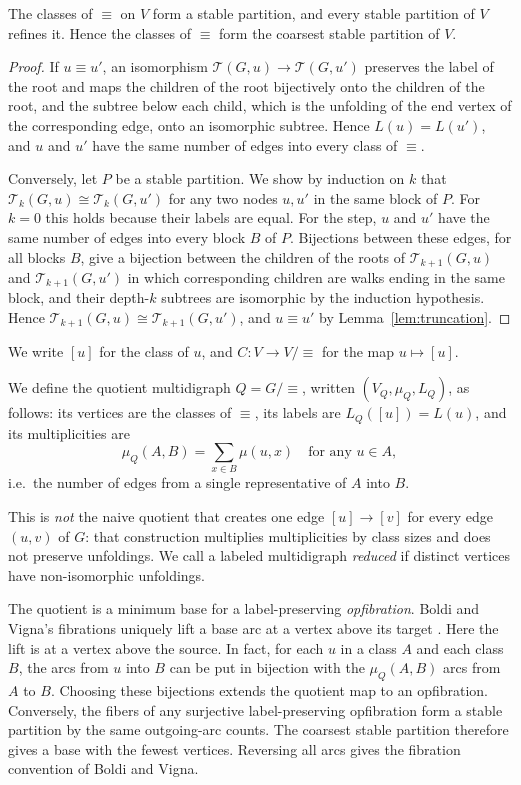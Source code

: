 \documentclass[twoside,leqno]{article}
\newcommand{\Unf}{\mathcal{T}}
\newcommand{\iso}{\cong}
\begin{document}
\begin{lemma}
\label{lem:stable}
The classes of $\equiv$ on $V$ form a stable partition, and every stable partition of $V$ refines it. Hence the classes of $\equiv$ form the coarsest stable partition of $V$.
\end{lemma}
\begin{proof}
If $u\equiv u'$, an isomorphism $\Unf(G,u)\to\Unf(G,u')$ preserves the label of the root and maps the children of the root bijectively onto the children of the root, and the subtree below each child, which is the unfolding of the end vertex of the corresponding edge, onto an isomorphic subtree. Hence $L(u)=L(u')$, and $u$ and $u'$ have the same number of edges into every class of $\equiv$.

Conversely, let $P$ be a stable partition. We show by induction on $k$ that $\Unf_k(G,u)\iso\Unf_k(G,u')$ for any two nodes $u,u'$ in the same block of $P$. For $k=0$ this holds because their labels are equal. For the step, $u$ and $u'$ have the same number of edges into every block $B$ of $P$. Bijections between these edges, for all blocks $B$, give a bijection between the children of the roots of $\Unf_{k+1}(G,u)$ and $\Unf_{k+1}(G,u')$ in which corresponding children are walks ending in the same block, and their depth-$k$ subtrees are isomorphic by the induction hypothesis. Hence $\Unf_{k+1}(G,u)\iso\Unf_{k+1}(G,u')$, and $u\equiv u'$ by Lemma~\ref{lem:truncation}.
\end{proof}

We write $[u]$ for the class of $u$, and $C:V\to V/{\equiv}$ for the map $u\mapsto[u]$.

\begin{defn}
\label{def:quotient}
We define the quotient multidigraph $Q = G/{\equiv}$, written $(V_Q,\mu_Q,L_Q)$, as follows: its vertices are the classes of $\equiv$, its labels are $L_Q([u]) = L(u)$, and its multiplicities are
\[
\mu_Q(A,B) = \sum_{x\in B}\mu(u,x) \quad\text{for any } u\in A,
\]
i.e.\ the number of edges from a single representative of $A$ into $B$.
\end{defn}

This is \emph{not} the naive quotient that creates one edge $[u]\to[v]$ for every edge $(u,v)$ of $G$: that construction multiplies multiplicities by class sizes and does not preserve unfoldings. We call a labeled multidigraph \emph{reduced} if distinct vertices have non-isomorphic unfoldings.

The quotient is a minimum base for a label-preserving \emph{opfibration}. Boldi and Vigna's fibrations uniquely lift a base arc at a vertex above its target \cite{boldi2002fibrations}. Here the lift is at a vertex above the source. In fact, for each $u$ in a class $A$ and each class $B$, the arcs from $u$ into $B$ can be put in bijection with the $\mu_Q(A,B)$ arcs from $A$ to $B$. Choosing these bijections extends the quotient map to an opfibration. Conversely, the fibers of any surjective label-preserving opfibration form a stable partition by the same outgoing-arc counts. The coarsest stable partition therefore gives a base with the fewest vertices. Reversing all arcs gives the fibration convention of Boldi and Vigna.
\end{document}
